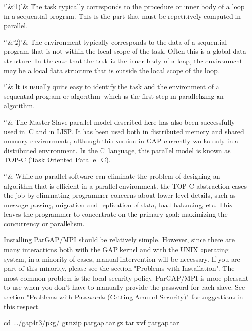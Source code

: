 \beginitems
`'&`1)'& The task typically corresponds to the procedure or inner body
       of a loop in a sequential program.  This is the part that must
       be repetitively computed in parallel.

`'&`2)'& The environment typically corresponds to the data of a
       sequential program that is not within the local scope of the
       task.  Often this is a global data structure.  In the case that
       the task is the inner body of a loop, the environment may be a
       local data structure that is outside the local scope of the
       loop.
\enditems

`'& It is usually quite easy to identify the task and the environment
    of a sequential program or algorithm, which is the first step in
    parallelizing an algorithm.

`'& The Master Slave parallel model described here has also been
    successfully used in~C and in LISP.  It has been used both in
    distributed memory and shared memory environments, although this
    version in GAP currently works only in a distributed environment.
    In the C~language, this parallel model is known as TOP-C (Task
    Oriented Parallel~C).

`'& While no parallel software can eliminate the problem of designing
    an algorithm that is efficient in a parallel environment, the
    TOP-C abstraction eases the job by eliminating programmer concerns
    about lower level details, such as message passing, migration and
    replication of data, load balancing, etc.  This leaves the
    programmer to concentrate on the primary goal: maximizing the
    concurrency or parallelism.
\enditems



Installing ParGAP/MPI should be relatively simple.  However, since
there are many interactions both with the GAP kernel and with the
UNIX operating system, in a minority of cases, manual intervention
will be necessary.  If you are part of this minority, please
see the section "Problems with Installation".  The most common
problem is the local security policy.  ParGAP/MPI is more pleasant to
use when you don't have to manually provide the password for each
slave.  See section "Problems with Passwords (Getting Around Security)"
for suggestions in this respect.

\begintt
  cd .../gap4r3/pkg/
  gunzip pargap.tar.gz
  tar xvf pargap.tar
\endtt


